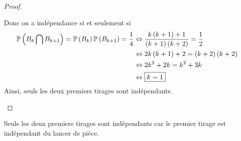\begin{proof}
\begin{enumerate}
        Donc on a indépendance si et seulement si 
        \begin{align}
            \P\left(B_{k}\bigcap B_{k+1}\right)=\P\left(B_{k}\right)\P\left(B_{k+1}\right)=\frac{1}{4}
            &\Leftrightarrow \frac{k\left(k+1\right)+1}{\left(k+1\right)\left(k+2\right)}=\frac{1}{2}\\
            &\Leftrightarrow 2k\left(k+1\right)+2=\left(k+2\right)\left(k+2\right)\\
            &\Leftrightarrow 2k^{2}+2k=k^{2}+3k\\
            &\Leftrightarrow \boxed{k=1}
        \end{align}
        Ainsi, seuls les deux premiers tirages sont indépendants.
    \end{enumerate}
\end{proof}

\begin{remark}
    Seuls les deux premiers tirages sont indépendants car le premier tirage est indépendant du lancer de pièce.
\end{remark}

